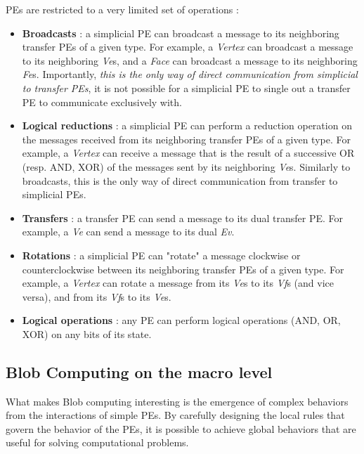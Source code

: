 \documentclass[11pt,a4paper]{report}
\begin{document}
PEs are restricted to a very limited set of operations :
\begin{itemize}
    \item \textbf{Broadcasts} : a simplicial PE can broadcast a message to its neighboring transfer PEs of a given type. For example, a \textit{Vertex} can broadcast a message to its neighboring \textit{Ve}s, and a \textit{Face} can broadcast a message to its neighboring \textit{Fe}s. Importantly, \textit{this is the only way of direct communication from simplicial to transfer PEs}, it is not possible for a simplicial PE to single out a transfer PE to communicate exclusively with.
    
    \item \textbf{Logical reductions} : a simplicial PE can perform a reduction operation on the messages received from its neighboring transfer PEs of a given type. For example, a \textit{Vertex} can receive a message that is the result of a successive OR (resp. AND, XOR) of the messages sent by its neighboring \textit{Ve}s. Similarly to broadcasts, this is the only way of direct communication from transfer to simplicial PEs.
    
    \item \textbf{Transfers} : a transfer PE can send a message to its dual transfer PE. For example, a \textit{Ve} can send a message to its dual \textit{Ev}.
    
    \item \textbf{Rotations} : a simplicial PE can "rotate" a message clockwise or counterclockwise between its neighboring transfer PEs of a given type. For example, a \textit{Vertex} can rotate a message from its \textit{Ve}s to its \textit{Vf}s (and vice versa), and from its \textit{Vf}s to its \textit{Ve}s.
    
    \item \textbf{Logical operations} : any PE can perform logical operations (AND, OR, XOR) on any bits of its state.
\end{itemize}

\subsection{Blob Computing on the macro level}
\label{sec:macro_level}

What makes Blob computing interesting is the emergence of complex behaviors from the interactions of simple PEs. By carefully designing the local rules that govern the behavior of the PEs, it is possible to achieve global behaviors that are useful for solving computational problems.
\end{document}
